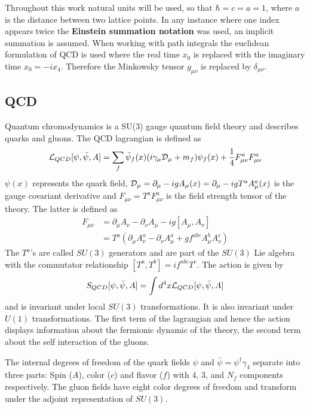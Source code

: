 Throughout this work natural units will be used, so that $\hbar = c = a = 1$, where $a$ is the distance between two lattice points.	In any instance where one index appears twice the \textbf{Einstein summation notation} was used, an implicit summation is assumed. When working with path integrals the euclidean formulation of QCD is used where the real time $x_0$ is replaced with the imaginary time $x_0 = -ix_4$. Therefore the Minkowsky tensor $g_{\mu\nu}$ is replaced by $\delta_{\mu\nu}$.
	
\subsection{QCD}
	Quantum chromodynamics is a SU(3) gauge quantum field theory and describes quarks and gluons. The QCD lagrangian is defined as \cite{qcd1_script_philipsen}
	\begin{equation}
	    \mathcal{L}_{QCD}[\psi,\bar{\psi}, A] = \sum_f \bar{\psi}_f(x)(i\gamma_\mu\mathcal{D}_\mu + m_f)\psi_f(x) + \frac{1}{4}F^a_{\mu\nu}F^a_{\mu\nu}
	    \label{qcd_lagrangian}
	\end{equation}
	$\psi(x)$ represents the quark field, $\mathcal{D}_\mu = \partial_\mu - igA_\mu(x) = \partial_\mu-igT^aA^a_\mu(x)$ is the gauge covariant derivative and $F_{\mu\nu} = T^aF^a_{\mu\nu}$ is the field strength tensor of the theory. The latter is defined as
	\begin{equation}\label{strenth_tensor}
	\begin{aligned}
	    F_{\mu\nu} &= \partial_\mu A_\nu - \partial_\nu A_\mu-ig[A_\mu,A_\nu]\\
	    &= T^a(\partial_\mu A^a_\nu - \partial_\nu A^a_\mu + g f^{abc}A^b_\mu A^c_\nu)
	\end{aligned}
	\end{equation}
	\noindent
	The $T^a$'s are called $SU(3)$ generators and are part of the $SU(3)$ Lie algebra with the commutator relationship $[T^a,T^b]=if^{abc}T^c$. The action is given by
	\begin{equation}
	    S_{QCD}[\psi,\bar{\psi}, A] = \int d^4x \mathcal{L}_{QCD}[\psi,\bar{\psi}, A]
	\end{equation}
	and is invariant under local $SU(3)$ transformations. It is also invariant under $U(1)$ transformations. The first term of the lagrangian and hence the action displays information about the fermionic dynamic of the theory, the second term about the self interaction of the gluons.
	
	The internal degrees of freedom of the quark fields $\psi$ and $\bar{\psi}=\psi^\dagger\gamma_4$ separate into three parts: Spin ($A$), color ($c$) and flavor ($f$) with 4, 3, and $N_f$ components respectively. The gluon fields have eight color degrees of freedom and transform under the adjoint representation of $SU(3)$.